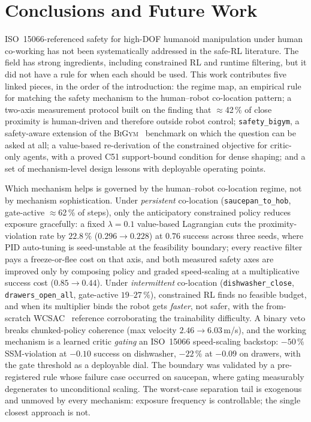 \documentclass[11pt,a4paper]{report}
\newcommand{\ssm}{SSM}
\newcommand{\iso}{ISO~15066}
\newcommand{\bigym}{\textsc{BiGym}}
\newcommand{\sbigym}{\texttt{safety\_bigym}}
\begin{document}
\chapter{Conclusions and Future Work}
\label{ch:conclusion}

\noindent
\iso{}-referenced safety for high-DOF humanoid manipulation under
human co-working has not been systematically addressed in the safe-RL
literature. The field has strong ingredients, including constrained
RL and runtime filtering, but it did not have a rule for when each
should be used. This work contributes five linked pieces, in the
order of the introduction: the regime map, an empirical rule for
matching the safety mechanism to the human--robot co-location
pattern; a two-axis measurement protocol built on the finding that
$\approx$42\,\% of close proximity is human-driven and therefore
outside robot control; \sbigym{}, a safety-aware extension of the
\bigym{}~\cite{chernyadev2024bigym} benchmark on which the question
can be asked at all; a value-based re-derivation of the constrained
objective for critic-only agents, with a proved C51 support-bound
condition for dense shaping; and a set of mechanism-level design
lessons with deployable operating points.

\noindent
Which mechanism helps is governed by the human--robot co-location
regime, not by mechanism sophistication. Under \emph{persistent}
co-location (\texttt{saucepan\_to\_hob}, gate-active
$\approx$62\,\% of steps), only the anticipatory constrained policy
reduces exposure gracefully: a fixed $\lambda = 0.1$ value-based
Lagrangian cuts the proximity-violation rate by $22.8\,\%$
($0.296 \to 0.228$) at $0.76$ success across three seeds, where PID
auto-tuning is seed-unstable at the feasibility boundary; every
reactive filter pays a freeze-or-flee cost on that axis, and both
measured safety axes are improved only by composing policy and graded
speed-scaling at a multiplicative success cost ($0.85 \to 0.44$).
Under
\emph{intermittent} co-location (\texttt{dishwasher\_close},
\texttt{drawers\_open\_all}, gate-active $19$--$27\,\%$),
constrained RL finds no feasible budget, and when its multiplier
binds the robot gets \emph{faster}, not safer, with the from-scratch
WCSAC~\cite{yang2021wcsac} reference corroborating the trainability
difficulty. A binary veto breaks chunked-policy coherence (max
velocity $2.46 \to 6.03$\,m/s), and the working mechanism is a
learned critic \emph{gating} an \iso{} speed-scaling backstop:
$-50\,\%$ \ssm{}-violation at $-0.10$ success on dishwasher,
$-22\,\%$ at $-0.09$ on drawers, with the gate threshold as a
deployable dial.
The boundary was validated by a pre-registered rule whose failure case
occurred on saucepan, where gating measurably degenerates to
unconditional scaling. The worst-case separation tail is
exogenous and unmoved by every mechanism: exposure frequency is
controllable; the single closest approach is not.
\end{document}
